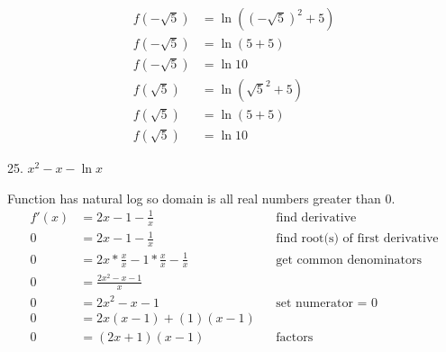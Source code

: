 \documentclass{article}
\begin{document}
\begin{description}
\begin{description}
\begin{align*}
                  f(-\sqrt{5}) & = \ln{((-\sqrt{5})^2+5)} \\
                  f(-\sqrt{5}) & = \ln{(5 + 5)}           \\
                  f(-\sqrt{5}) & = \ln{10}                \\[2em]
                  f(\sqrt{5})  & =\ln{(\sqrt{5}^2+5)}     \\
                  f(\sqrt{5})  & = \ln{(5 + 5)}           \\
                  f(\sqrt{5})  & =\ln{10}
                \end{align*}
          \item 25. $x^2 - x - \ln{x}$

                Function has natural log so domain is all real numbers greater than 0.
                \begin{align*}
                  f'(x) & = 2x - 1 - \frac{1}{x}                             &  & \text{find derivative}                  \\[2em]
                  0     & = 2x - 1 - \frac{1}{x}                             &  & \text{find root(s) of first derivative} \\
                  0     & = 2x * \frac{x}{x} - 1 * \frac{x}{x} - \frac{1}{x} &  & \text{get common denominators}          \\
                  0     & = \frac{2x^2 - x - 1}{x}                                                                        \\[2em]
                  0     & = 2x^2 - x - 1                                     &  & \text{set numerator = 0}                \\
                  0     & = 2x(x - 1) + (1)(x - 1)                                                                        \\
                  0     & = (2x + 1)(x - 1)                                  &  & \text{factors}
                \end{align*}


\end{description}
\end{description}
\end{document}
